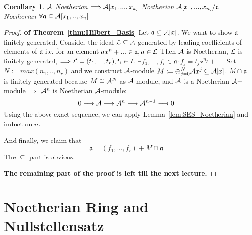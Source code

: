 \documentclass[11pt]{article}
\newtheorem{cor}[thm]{Corollary}
\newcommand{\sca}{{\mathfrak a}}
\newcommand{\cala}{{\cal A}}
\newcommand{\call}{{\cal L}}
\newcommand{\Lrta}{\Longrightarrow}
\newcommand{\lrta}{\longrightarrow}
\begin{document}
\begin{cor}\label{cor:Noetherian_quotient_module}
$\cala$ Noetherian $\Lrta \cala[x_1,...,x_n]$ Noetherian $\cala[x_1,...,x_n]/\sca$ Noetherian $\forall \sca\subseteq \cala[x_1,..,x_n]$
\end{cor}

\begin{proof}\textbf{of Theorem~\ref{thm:Hilbert_Basis}}
Let $\sca\subseteq \cala[x]$. We want to show $\sca$ finitely generated. Consider the ideal $\call\subseteq \cala$ generated by leading coefficients of elements of $\sca$ i.e. for an element $ax^n+...\in\sca,a\in\call$
Then $\cala$ is  Noetherian, $\call$ is finitely generated, $\Lrta\call=(t_1,...,t_r),t_i\in \call$ $\exists f_1,...,f_r\in \sca: f_j=t_j x^{n_j}+...$. Set $N:=max(n_1,..,n_r)$ and we construct $\cala$-module $M:=\oplus^N_{j=0}\cala x^j\subseteq \cala[x]$. $M\cap \sca$ is finitely generated because $M\cong \cala^N$ as $\cala$-module, and $\cala$ is a Noetherian $\cala-$module $\Lrta$ $\cala^n$ is Noetherian $\cala$-module:
$$
0\lrta \cala\lrta \cala^n\lrta \cala^{n-1}\lrta 0
$$
Using the above exact sequence, we can apply Lemma~\ref{lem:SES_Noetherian} and induct on $n$.

And finally, we claim that
$$
\sca=(f_1,...,f_r)+M\cap\sca
$$
The $\subseteq$ part is obvious.

\textbf{The remaining part of the proof is left till the next lecture.}
\end{proof}

\section{Noetherian Ring and Nullstellensatz}
\end{document}

